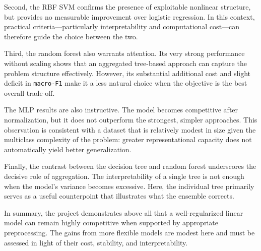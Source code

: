 Second, the RBF SVM confirms the presence of exploitable nonlinear structure, but provides no measurable improvement over logistic regression. In this context, practical criteria---particularly interpretability and computational cost---can therefore guide the choice between the two.

Third, the random forest also warrants attention. Its very strong performance without scaling shows that an aggregated tree-based approach can capture the problem structure effectively. However, its substantial additional cost and slight deficit in \texttt{macro-F1} make it a less natural choice when the objective is the best overall trade-off.

The MLP results are also instructive. The model becomes competitive after normalization, but it does not outperform the strongest, simpler approaches. This observation is consistent with a dataset that is relatively modest in size given the multiclass complexity of the problem: greater representational capacity does not automatically yield better generalization.

Finally, the contrast between the decision tree and random forest underscores the decisive role of aggregation. The interpretability of a single tree is not enough when the model's variance becomes excessive. Here, the individual tree primarily serves as a useful counterpoint that illustrates what the ensemble corrects.

In summary, the project demonstrates above all that a well-regularized linear model can remain highly competitive when supported by appropriate preprocessing. The gains from more flexible models are modest here and must be assessed in light of their cost, stability, and interpretability.

